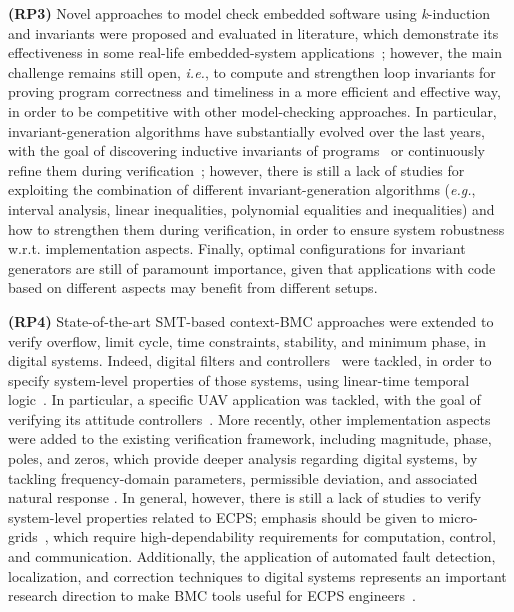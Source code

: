\documentclass{cta-author}
\begin{document}
\textbf{(RP3)} Novel approaches to model check embedded software using \textit{k}-induction and invariants were proposed and evaluated in literature, which demonstrate its effectiveness in some real-life embedded-system applications~\cite{Gadelha15,Brain15,Rocha17,Donaldson10}; however, the main challenge remains still open, {\it i.e.}, to compute and strengthen loop invariants for proving program correctness and timeliness in a more efficient and effective way, in order to be competitive with other model-checking approaches. In particular, invariant-generation algorithms have substantially evolved over the last years, with the goal of discovering inductive invariants of programs~\cite{pips:2013,Henry:2012} or continuously refine them during verification~\cite{Beyer15}; however, there is still a lack of studies for exploiting the combination of different invariant-generation algorithms ({\it e.g.}, interval analysis, linear inequalities, polynomial equalities and inequalities) and how to strengthen them during verification, in order to ensure system robustness w.r.t. implementation aspects. Finally, optimal configurations for invariant generators are still of paramount importance, given that applications with code based on different aspects may benefit from different setups.

\textbf{(RP4)} State-of-the-art SMT-based context-BMC approaches were extended to verify overflow, limit cycle, time constraints, stability, and minimum phase, in digital systems. Indeed, digital filters and controllers~\cite{dsv_spin2015,esbmc_controller,esbmc_filter} were tackled, in order to specify system-level properties of those systems, using linear-time temporal logic~\cite{JMorse15}. In particular, a specific UAV application was tackled, with the goal of verifying its attitude controllers~\cite{Bessa16,Chaves17}. More recently, other implementation aspects were added to the existing verification framework, including magnitude, phase, poles, and zeros, which provide deeper analysis regarding digital systems, by tackling frequency-domain parameters, permissible deviation, and associated natural response \cite{sbrtdaniel}. In general, however, there is still a lack of studies to verify system-level properties related to ECPS; emphasis should be given to micro-grids~\cite{xu15}, which require high-dependability requirements for computation, control, and communication. Additionally, the application of automated fault detection, localization, and correction techniques to digital systems represents an important research direction to make BMC tools useful for ECPS engineers~\cite{Alves15}.
\end{document}
